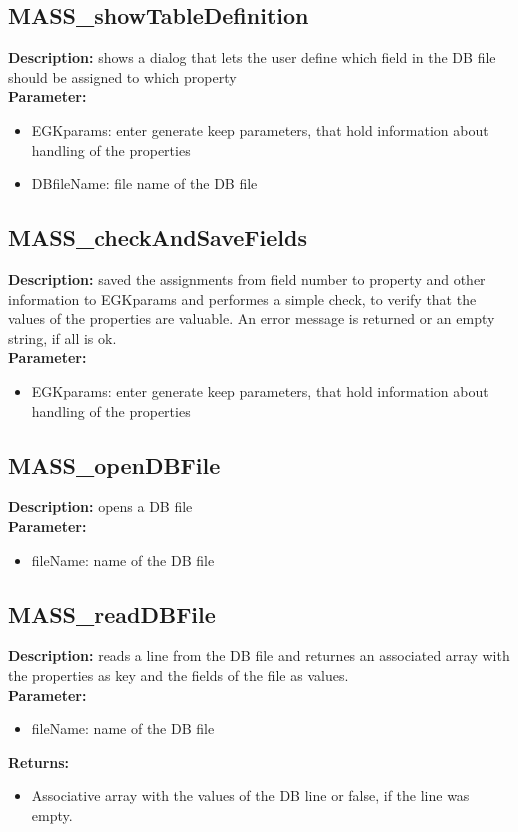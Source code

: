 \subsection{MASS\_showTableDefinition}
\textbf{Description:} shows a dialog that lets the user define which field in the DB file should be assigned to which property\\
\textbf{Parameter:}
\begin{itemize}
\item EGKparams: enter generate keep parameters, that hold information about handling of the properties
\item DBfileName: file name of the DB file
\end{itemize}

\subsection{MASS\_checkAndSaveFields}
\textbf{Description:} saved the assignments from field number to property and other information to EGKparams and performes a simple check, to verify that the values of the properties are valuable. An error message is returned or an empty string, if all is ok.\\
\textbf{Parameter:}
\begin{itemize}
\item EGKparams: enter generate keep parameters, that hold information about handling of the properties
\end{itemize}

\subsection{MASS\_openDBFile}
\textbf{Description:} opens a DB file\\
\textbf{Parameter:}
\begin{itemize}
\item fileName: name of the DB file
\end{itemize}

\subsection{MASS\_readDBFile}
\textbf{Description:} reads a line from the DB file and returnes an associated array with the properties as key and the fields of the file as values.\\
\textbf{Parameter:}
\begin{itemize}
\item fileName: name of the DB file
\end{itemize}
\textbf{Returns:}
\begin{itemize}
\item Associative array with the values of the DB line or false, if the line was empty.
\end{itemize}

